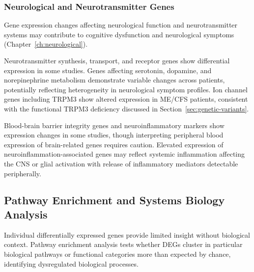 \subsubsection{Neurological and Neurotransmitter Genes}

Gene expression changes affecting neurological function and neurotransmitter systems may contribute to cognitive dysfunction and neurological symptoms (Chapter~\ref{ch:neurological}).

Neurotransmitter synthesis, transport, and receptor genes show differential expression in some studies. Genes affecting serotonin, dopamine, and norepinephrine metabolism demonstrate variable changes across patients, potentially reflecting heterogeneity in neurological symptom profiles. Ion channel genes including TRPM3 show altered expression in ME/CFS patients, consistent with the functional TRPM3 deficiency discussed in Section~\ref{sec:genetic-variants}.

Blood-brain barrier integrity genes and neuroinflammatory markers show expression changes in some studies, though interpreting peripheral blood expression of brain-related genes requires caution. Elevated expression of neuroinflammation-associated genes may reflect systemic inflammation affecting the CNS or glial activation with release of inflammatory mediators detectable peripherally.

\subsection{Pathway Enrichment and Systems Biology Analysis}

Individual differentially expressed genes provide limited insight without biological context. Pathway enrichment analysis tests whether DEGs cluster in particular biological pathways or functional categories more than expected by chance, identifying dysregulated biological processes.

